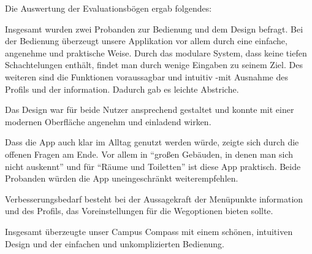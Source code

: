 Die Auswertung der Evaluationsbögen ergab folgendes:

Insgesamt wurden zwei Probanden zur Bedienung und dem Design befragt.
Bei der Bedienung überzeugt unsere Applikation vor allem durch eine einfache, angenehme und praktische Weise. Durch das modulare System, dass keine tiefen Schachtelungen enthält, findet man durch wenige Eingaben zu seinem Ziel.
Des weiteren sind die Funktionen voraussagbar und intuitiv -mit Ausnahme des Profils und der \gls{information}. Dadurch gab es leichte Abstriche.

Das Design war für beide Nutzer ansprechend gestaltet und konnte mit einer modernen Oberfläche angenehm und einladend wirken.

Dass die App auch klar im Alltag genutzt werden würde, zeigte sich durch die offenen Fragen am Ende. Vor allem in "`großen Gebäuden, in denen man sich nicht auskennt"' und für "`Räume und Toiletten"' ist diese App praktisch.
Beide Probanden würden die App uneingeschränkt weiterempfehlen.

Verbesserungsbedarf besteht bei der Aussagekraft der Menüpunkte \gls{information} und des Profils, das Voreinstellungen für die Wegoptionen bieten sollte.

Insgesamt überzeugte unser Campus Compass mit einem schönen, intuitiven Design und der einfachen und unkomplizierten Bedienung.